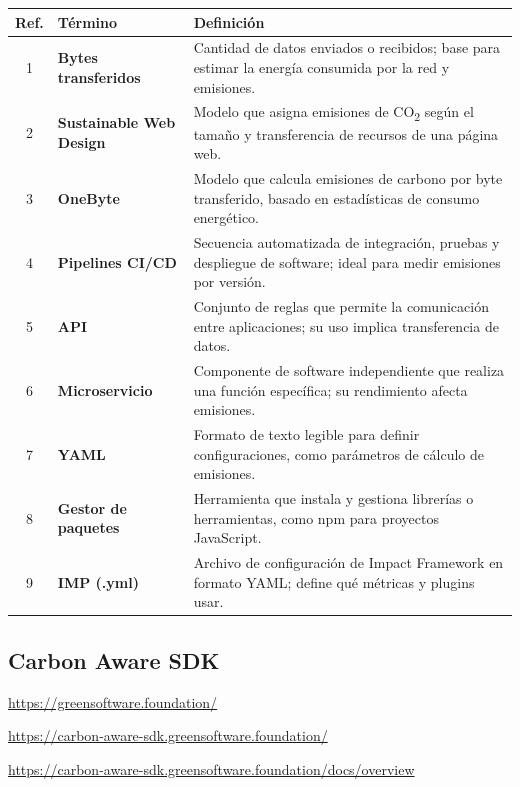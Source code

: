 \documentclass[12pt,a4paper]{report}
\begin{document}
\begin{table}[h]
\centering
\begin{tabular}{@{}cll@{}}
\toprule
\textbf{Ref.} & \textbf{Término} & \textbf{Definición} \\
\midrule
1 & \textbf{Bytes transferidos} & Cantidad de datos enviados o recibidos; base para estimar la energía consumida por la red y emisiones. \\
2 & \textbf{Sustainable Web Design} & Modelo que asigna emisiones de CO\textsubscript{2} según el tamaño y transferencia de recursos de una página web. \\
3 & \textbf{OneByte} & Modelo que calcula emisiones de carbono por byte transferido, basado en estadísticas de consumo energético. \\
4 & \textbf{Pipelines CI/CD} & Secuencia automatizada de integración, pruebas y despliegue de software; ideal para medir emisiones por versión. \\
5 & \textbf{API} & Conjunto de reglas que permite la comunicación entre aplicaciones; su uso implica transferencia de datos. \\
6 & \textbf{Microservicio} & Componente de software independiente que realiza una función específica; su rendimiento afecta emisiones. \\
7 & \textbf{YAML} & Formato de texto legible para definir configuraciones, como parámetros de cálculo de emisiones. \\
8 & \textbf{Gestor de paquetes} & Herramienta que instala y gestiona librerías o herramientas, como npm para proyectos JavaScript. \\
9 & \textbf{IMP (.yml)} & Archivo de configuración de Impact Framework en formato YAML; define qué métricas y plugins usar. \\
\bottomrule
\end{tabular}
\end{table}

\subsection*{Carbon Aware SDK}

\href{https://greensoftware.foundation/}{https://greensoftware.foundation/}

\href{https://carbon-aware-sdk.greensoftware.foundation/}{https://carbon-aware-sdk.greensoftware.foundation/}

\href{https://carbon-aware-sdk.greensoftware.foundation/docs/overview}{https://carbon-aware-sdk.greensoftware.foundation/docs/overview}
\end{document}
